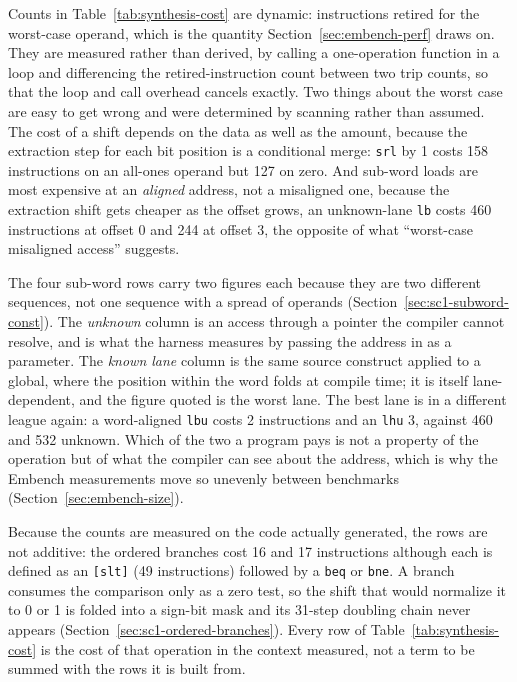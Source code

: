 Counts in Table~\ref{tab:synthesis-cost} are dynamic: instructions retired for the worst-case operand,
which is the quantity Section~\ref{sec:embench-perf} draws on. They are measured rather than derived,
by calling a one-operation function in a loop and differencing the retired-instruction count between
two trip counts, so that the loop and call overhead cancels exactly. Two things about the worst case
are easy to get wrong and were determined by scanning rather than assumed. The cost of a shift depends
on the data as well as the amount, because the extraction step for each bit position is a conditional
merge: \texttt{srl} by 1 costs 158 instructions on an all-ones operand but 127 on zero. And sub-word
loads are most expensive at an \textit{aligned} address, not a misaligned one, because the extraction
shift gets cheaper as the offset grows, an unknown-lane \texttt{lb} costs 460 instructions at
offset 0 and 244 at offset 3, the opposite of what ``worst-case misaligned access'' suggests.

The four sub-word rows carry two figures each because they are two different sequences, not one
sequence with a spread of operands (Section~\ref{sec:sc1-subword-const}). The \textit{unknown} column
is an access through a pointer the compiler cannot resolve, and is what the harness measures by
passing the address in as a parameter. The \textit{known lane} column is the same source construct
applied to a global, where the position within the word folds at compile time; it is itself
lane-dependent, and the figure quoted is the worst lane. The best lane is in a different league again:
a word-aligned \texttt{lbu} costs 2 instructions and an \texttt{lhu} 3, against 460 and 532 unknown.
Which of the two a program pays is not a property of the operation but of what the compiler can see
about the address, which is why the Embench measurements move so unevenly between benchmarks
(Section~\ref{sec:embench-size}).

Because the counts are measured on the code actually generated, the rows are not additive: the ordered
branches cost 16 and 17 instructions although each is defined as an \texttt{[slt]} (49 instructions)
followed by a \texttt{beq} or \texttt{bne}. A branch consumes the comparison only as a zero test,
so the shift that would normalize it to 0 or 1 is folded into a sign-bit mask and its 31-step doubling
chain never appears (Section~\ref{sec:sc1-ordered-branches}). Every row of
Table~\ref{tab:synthesis-cost} is the cost of that operation in the context measured, not a term to be
summed with the rows it is built from.

